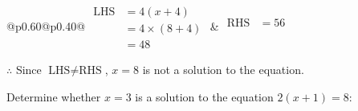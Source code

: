 \documentclass[12pt]{article}
\newcounter{minipagecount}
\begin{document}
\begin{multicols}{2}
\begin{minipage}[t]{0.40\textwidth}
    \renewcommand{\arraystretch}{1.3} %
    \begin{tabular}{@{}p{0.60\linewidth}@{}p{0.40\linewidth}@{}}
        \(\begin{aligned}
            \text{LHS} &= 4(x + 4) \\
                    &= 4 \times(8 + 4) \\
                    &= 48
        \end{aligned}\) &
        \(\begin{aligned}
            \text{RHS} &= 56\\
                    & \\
                    &
        \end{aligned}\)
    \end{tabular}
    \renewcommand{\arraystretch}{1.0} %
    \vspace{2pt}  %

    \noindent \(\therefore\) Since \(\text{LHS} \neq \text{RHS}\), \(x = 8\) is not  a solution to the equation.

\end{minipage}

 \vspace*{16pt}
\columnbreak
\noindent{(\theminipagecount)}\hspace{0.1mm} %
\begin{minipage}[t]{0.40\textwidth} %

    \noindent Determine whether \(x = 3\) is a solution to the equation \(2(x + 1) = 8\):
    \vspace{4pt}  %

    \noindent


\end{minipage}
\end{multicols}
\end{document}
